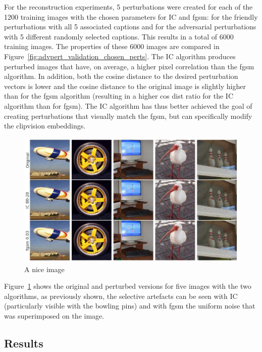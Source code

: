 For the reconstruction experiments, 5 perturbations were created for each of the 1200 training images with the chosen parameters for IC and fgsm: for the friendly perturbations with all 5 associated captions and for the adversarial perturbations with 5 different randomly selected captions. This results in a total of 6000 training images. The properties of these 6000 images are compared in Figure~\ref{fig:advpert_validation_chosen_perts}. The IC algorithm produces perturbed images that have, on average, a higher pixel correlation than the fgsm algorithm. In addition, both the cosine distance to the desired perturbation vectors is lower and the cosine distance to the original image is slightly higher than for the fgsm algorithm (resulting in a higher cos dist ratio for the IC algorithm than for fgsm). The IC algorithm has thus better achieved the goal of creating perturbations that visually match the fgsm, but can specifically modify the clipvision embeddings.

\begin{figure}[ht]
    \centering
    \includegraphics[width=1\textwidth]{plots/advpert_validation_chosen_qual.png}
    \caption{A nice image}\label{fig:advpert_validation_chosen_qual}
\end{figure}

Figure~\ref{fig:advpert_validation_chosen_qual} shows the original and perturbed versions for five images with the two algorithms, as previously shown, the selective artefacts can be seen with IC (particularly visible with the bowling pins) and with fgsm the uniform noise that was superimposed on the image. 


\subsection{Results}

